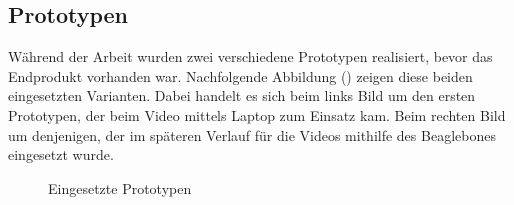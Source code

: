 \subsection{Prototypen}
Während der Arbeit wurden zwei verschiedene Prototypen realisiert, bevor das Endprodukt vorhanden war. Nachfolgende Abbildung () zeigen diese beiden eingesetzten Varianten. Dabei handelt es sich beim links Bild um den ersten Prototypen, der beim Video mittels Laptop zum Einsatz kam. Beim rechten Bild um denjenigen, der im späteren Verlauf für die Videos mithilfe des Beaglebones eingesetzt wurde.

\begin{figure}[H]
  \centering
  \caption{Eingesetzte Prototypen}
  \label{bPrototypen}
\end{figure}